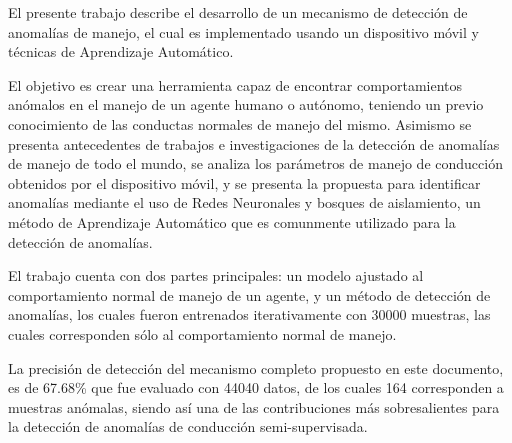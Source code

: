 El presente trabajo describe el desarrollo de un mecanismo de detecci\'{o}n de anomal\'{i}as de manejo, el cual es implementado usando un dispositivo m\'{o}vil y t\'{e}cnicas de Aprendizaje Autom\'{a}tico. 

El objetivo es crear una herramienta capaz de encontrar comportamientos an\'{o}malos en el manejo de un agente humano o aut\'{o}nomo, teniendo un previo conocimiento de las conductas normales de manejo del mismo. Asimismo se presenta antecedentes de trabajos e investigaciones de la detecci\'{o}n de anomal\'{i}as de manejo de todo el mundo, se analiza los par\'{a}metros de manejo de conducci\'{o}n obtenidos por el dispositivo m\'{o}vil, y se presenta la propuesta para identificar anomal\'{i}as mediante el uso de Redes Neuronales y bosques de aislamiento, un m\'{e}todo de Aprendizaje Autom\'{a}tico que es comunmente utilizado para la detecci\'{o}n de anomal\'{i}as.

El trabajo cuenta con dos partes principales: un modelo ajustado al comportamiento normal de manejo de un agente, y un m\'{e}todo de detecci\'{o}n de anomal\'{i}as, los cuales fueron entrenados iterativamente con 30000 muestras, las cuales corresponden s\'{o}lo al comportamiento normal de manejo.

La precisi\'{o}n de detecci\'{o}n del mecanismo completo propuesto en este documento, es de 67.68\% que fue evaluado con 44040 datos, de los cuales 164 corresponden a muestras an\'{o}malas, siendo as\'{i} una de las contribuciones m\'{a}s sobresalientes para la detecci\'{o}n de anomal\'{i}as de conducci\'{o}n semi-supervisada.





